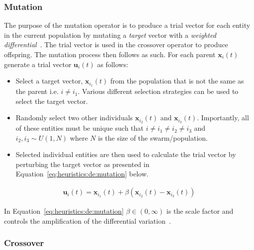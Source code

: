 \subsubsection{Mutation}\label{sec:heuristics:mh:de:mutation}

The purpose of the mutation operator is to produce a trial vector for each entity in the current population by mutating a \textit{target} vector with a \textit{weighted differential}~\cite{ref:engelbrecht:2007}. The trial vector is used in the crossover operator to produce offspring. The mutation process then follows as such. For each parent $\boldsymbol{x}_{i}(t)$ generate a trial vector $\boldsymbol{u}_{i}(t)$ as follows:

\begin{itemize}
	\item Select a target vector, $\boldsymbol{x}_{i_{1}}(t)$ from the population that is not the same as the parent i.e. $i \neq i_{1}$. Various different selection strategies can be used to select the target vector.

	\item Randomly select two other individuals $\boldsymbol{x}_{i_{2}}(t)$ and $\boldsymbol{x}_{i_{3}}(t)$. Importantly, all of these entities must be unique such that $i \neq i_{1} \neq i_{2} \neq i_{3}$ and $i_{2}, i_{3} \sim U(1, N)$ where $N$ is the size of the swarm/population.

	\item Selected individual entities are then used to calculate the trial vector by perturbing the target vector as presented in Equation~\eqref{eq:heuristics:de:mutation} below.
\end{itemize}


\begin{equation}
	\label{eq:heuristics:de:mutation}
	\begin{split}
		\boldsymbol{u}_{i}(t) = \boldsymbol{x}_{i_{1}}(t) + \beta(\boldsymbol{x}_{i_{2}}(t) - \boldsymbol{x}_{i_{3}}(t))
	\end{split}
\end{equation}

In Equation~\eqref{eq:heuristics:de:mutation} $\beta \in (0, \infty)$ is the scale factor and controls the amplification of the differential variation~\cite{ref:engelbrecht:2007}.


\subsubsection{Crossover}\label{sec:heuristics:mh:de:crossover}

